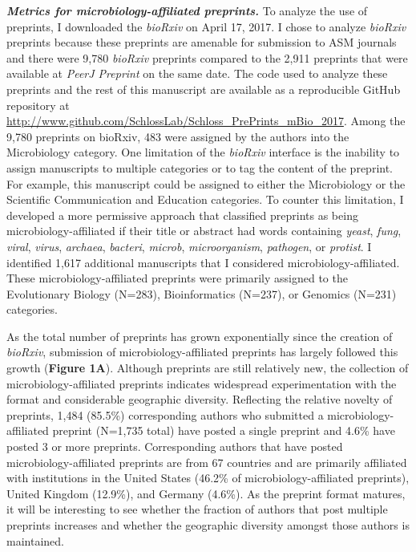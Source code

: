 \documentclass[11,]{article}
\begin{document}
\textbf{\emph{Metrics for microbiology-affiliated preprints.}} To
analyze the use of preprints, I downloaded the \emph{bioRxiv} on April
17, 2017. I chose to analyze \emph{bioRxiv} preprints because these
preprints are amenable for submission to ASM journals and there were
9,780 \emph{bioRxiv} preprints compared to the 2,911 preprints that were
available at \emph{PeerJ Preprint} on the same date. The code used to
analyze these preprints and the rest of this manuscript are available as
a reproducible GitHub repository at
\url{http://www.github.com/SchlossLab/Schloss_PrePrints_mBio_2017}.
Among the 9,780 preprints on bioRxiv, 483 were assigned by the authors
into the Microbiology category. One limitation of the \emph{bioRxiv}
interface is the inability to assign manuscripts to multiple categories
or to tag the content of the preprint. For example, this manuscript
could be assigned to either the Microbiology or the Scientific
Communication and Education categories. To counter this limitation, I
developed a more permissive approach that classified preprints as being
microbiology-affiliated if their title or abstract had words containing
\emph{yeast}, \emph{fung}, \emph{viral}, \emph{virus}, \emph{archaea},
\emph{bacteri}, \emph{microb}, \emph{microorganism}, \emph{pathogen}, or
\emph{protist}. I identified 1,617 additional manuscripts that I
considered microbiology-affiliated. These microbiology-affiliated
preprints were primarily assigned to the Evolutionary Biology (N=283),
Bioinformatics (N=237), or Genomics (N=231) categories.

As the total number of preprints has grown exponentially since the
creation of \emph{bioRxiv}, submission of microbiology-affiliated
preprints has largely followed this growth (\textbf{Figure 1A}).
Although preprints are still relatively new, the collection of
microbiology-affiliated preprints indicates widespread experimentation
with the format and considerable geographic diversity. Reflecting the
relative novelty of preprints, 1,484 (85.5\%) corresponding authors who
submitted a microbiology-affiliated preprint (N=1,735 total) have posted
a single preprint and 4.6\% have posted 3 or more preprints.
Corresponding authors that have posted microbiology-affiliated preprints
are from 67 countries and are primarily affiliated with institutions in
the United States (46.2\% of microbiology-affiliated preprints), United
Kingdom (12.9\%), and Germany (4.6\%). As the preprint format matures,
it will be interesting to see whether the fraction of authors that post
multiple preprints increases and whether the geographic diversity
amongst those authors is maintained.
\end{document}
